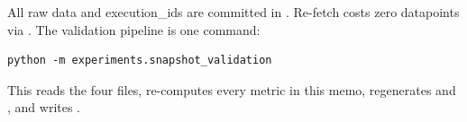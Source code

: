\documentclass[11pt]{article}
\begin{document}
All raw data and execution\_ids are committed in
. Re-fetch costs zero datapoints via
. The validation pipeline is one command:

\begin{lstlisting}
python -m experiments.snapshot_validation
\end{lstlisting}

This reads the four  files,
re-computes every metric in this memo, regenerates
 and
, and writes
.
\end{document}
